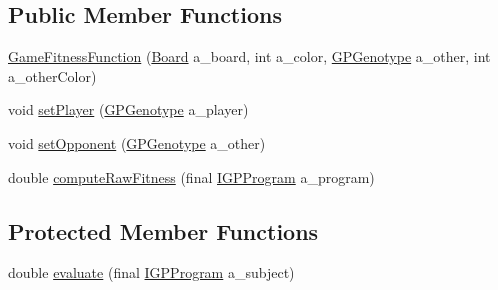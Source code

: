 \subsection*{Public Member Functions}
\begin{DoxyCompactItemize}
\item 
\hyperlink{classexamples_1_1gp_1_1tictactoe_1_1_tic_tac_toe_main_1_1_game_fitness_function_a2bda02c101be735f7d4da85bf2a5f84c}{Game\-Fitness\-Function} (\hyperlink{classexamples_1_1gp_1_1tictactoe_1_1_board}{Board} a\-\_\-board, int a\-\_\-color, \hyperlink{classorg_1_1jgap_1_1gp_1_1impl_1_1_g_p_genotype}{G\-P\-Genotype} a\-\_\-other, int a\-\_\-other\-Color)
\item 
void \hyperlink{classexamples_1_1gp_1_1tictactoe_1_1_tic_tac_toe_main_1_1_game_fitness_function_a93a7e84570ae4be49732fa7b7ecfe728}{set\-Player} (\hyperlink{classorg_1_1jgap_1_1gp_1_1impl_1_1_g_p_genotype}{G\-P\-Genotype} a\-\_\-player)
\item 
void \hyperlink{classexamples_1_1gp_1_1tictactoe_1_1_tic_tac_toe_main_1_1_game_fitness_function_aa941d88f6db43fd04594d1a35888181f}{set\-Opponent} (\hyperlink{classorg_1_1jgap_1_1gp_1_1impl_1_1_g_p_genotype}{G\-P\-Genotype} a\-\_\-other)
\item 
double \hyperlink{classexamples_1_1gp_1_1tictactoe_1_1_tic_tac_toe_main_1_1_game_fitness_function_abbccfc65cec2ab000327b001f2089822}{compute\-Raw\-Fitness} (final \hyperlink{interfaceorg_1_1jgap_1_1gp_1_1_i_g_p_program}{I\-G\-P\-Program} a\-\_\-program)
\end{DoxyCompactItemize}
\subsection*{Protected Member Functions}
\begin{DoxyCompactItemize}
\item 
double \hyperlink{classexamples_1_1gp_1_1tictactoe_1_1_tic_tac_toe_main_1_1_game_fitness_function_aad6c405f1a97dc9012c015f128465b24}{evaluate} (final \hyperlink{interfaceorg_1_1jgap_1_1gp_1_1_i_g_p_program}{I\-G\-P\-Program} a\-\_\-subject)
\end{DoxyCompactItemize}
